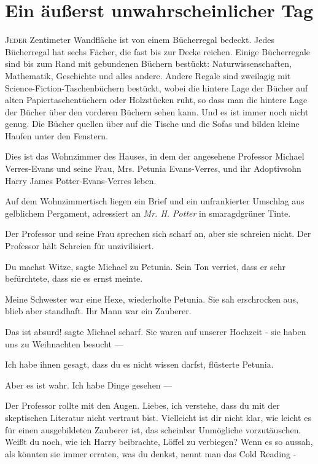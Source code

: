\chapter{Ein äußerst unwahrscheinlicher Tag}

\lettrine{J}{eder} Zentimeter Wandfläche ist von einem Bücherregal bedeckt.
Jedes Bücherregal hat sechs Fächer, die fast bis zur Decke reichen. Einige
Bücherregale sind bis zum Rand mit gebundenen Büchern bestückt:
Naturwissenschaften, Mathematik, Geschichte und alles andere. Andere Regale sind
zweilagig mit Science-Fiction-Taschenbüchern bestückt, wobei die hintere Lage
der Bücher auf alten Papiertaschentüchern oder Holzstücken ruht, so dass man die
hintere Lage der Bücher über den vorderen Büchern sehen kann. Und es ist immer
noch nicht genug. Die Bücher quellen über auf die Tische und die Sofas und
bilden kleine Haufen unter den Fenstern.

Dies ist das Wohnzimmer des Hauses, in dem der angesehene Professor Michael
Verres-Evans und seine Frau, Mrs. Petunia Evans-Verres, und ihr Adoptivsohn
Harry James Potter-Evans-Verres leben.

Auf dem Wohnzimmertisch liegen ein Brief und ein unfrankierter Umschlag aus
gelblichem Pergament, adressiert an \emph{Mr. H. Potter} in smaragdgrüner Tinte.

Der Professor und seine Frau sprechen sich scharf an, aber sie schreien nicht.
Der Professor hält Schreien für unzivilisiert.

\glqq{}Du machst Witze\grqq{}, sagte Michael zu Petunia. Sein Ton verriet, dass
er sehr befürchtete, dass sie es ernst meinte.

\glqq{}Meine Schwester war eine Hexe\grqq{}, wiederholte Petunia. Sie sah
erschrocken aus, blieb aber standhaft. \glqq{}Ihr Mann war ein Zauberer.\grqq{}

\glqq{}Das ist absurd!\grqq{} sagte Michael scharf. \glqq{}Sie waren auf unserer
Hochzeit - sie haben uns zu Weihnachten besucht ---\grqq{}

\glqq{}Ich habe ihnen gesagt, dass du es nicht wissen darfst\grqq{}, flüsterte
Petunia.

\glqq{}Aber es ist wahr. Ich habe Dinge gesehen ---\grqq{}

Der Professor rollte mit den Augen. \glqq{}Liebes, ich verstehe, dass du mit der
skeptischen Literatur nicht vertraut bist. Vielleicht ist dir nicht klar, wie
leicht es für einen ausgebildeten Zauberer ist, das scheinbar Unmögliche
vorzutäuschen. Weißt du noch, wie ich Harry beibrachte, Löffel zu verbiegen?
Wenn es so aussah, als könnten sie immer erraten, was du denkst, nennt man das
Cold Reading -\grqq{}


